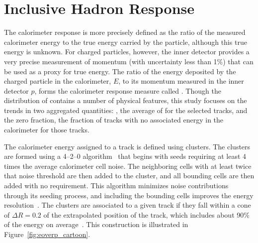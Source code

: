 
\section{Inclusive Hadron Response}
\label{sec:inclusive}

The calorimeter response is more precisely defined as the ratio of the measured calorimeter energy to the true energy carried by the particle, although this true energy is unknown. 
For charged particles, however, the inner detector provides a very precise measurement of momentum (with uncertainty less than 1\%) that can be used as a proxy for true energy.
The ratio of the energy deposited by the charged particle in the calorimeter, $E$, to its momentum measured in the inner detector $p$, forms the calorimeter response measure called \ep.
Though the distribution of \ep contains a number of physical features, this study focuses on the trends in two aggregated quantities: \epav, the average of \ep for the selected tracks, and the zero fraction, the fraction of tracks with no associated energy in the calorimeter for those tracks.

The calorimeter energy assigned to a track is defined using clusters. 
The clusters are formed using a 4--2--0 algorithm~\cite{TopoClusters} that begins with seeds requiring at least 4 times the average calorimeter cell noise. 
The neighboring cells with at least twice that noise threshold are then added to the cluster, and all bounding cells are then added with no requirement. 
This algorithm minimizes noise contributions through its seeding process, and including the bounding cells improves the energy resolution~\cite{Speckmayer}.
The clusters are associated to a given track if they fall within a cone of $\Delta R = 0.2$ of the extrapolated position of the track, which includes about 90\% of the energy on average~\cite{PERF-2011-05}.
This construction is illustrated in Figure~\ref{fig:eoverp_cartoon}.

